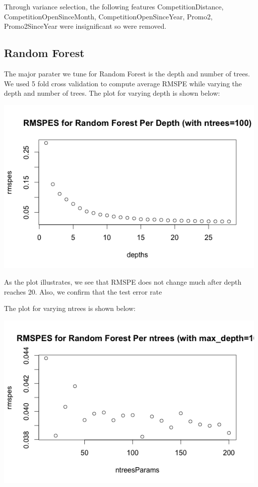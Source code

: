 \documentclass[letterpaper,twocolumn,11pt]{article}
\begin{document}
Through variance selection, the following features CompetitionDistance, CompetitionOpenSinceMonth, CompetitionOpenSinceYear, Promo2, Promo2SinceYear were insignificant so were removed.

\subsection{Random Forest}
The major parater we tune for Random Forest is the depth and number of trees. We used 5 fold cross validation to compute average RMSPE while varying the depth and number of trees. The plot for varying depth is shown below:

\includegraphics[scale=0.35]{img/RandomForestPerDepth.png}

As the plot illustrates, we see that RMSPE does not change much after depth reaches 20. Also, we confirm that the test error rate 

The plot for varying ntrees is shown below:

\includegraphics[scale=0.35]{img/RandomForestPerNtrees.png}
\end{document}
